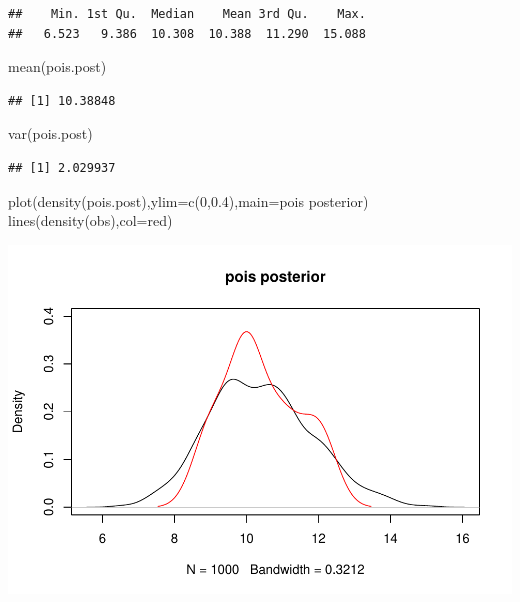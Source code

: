 \documentclass[
]{book}
\newenvironment{Shaded}{\begin{snugshade}}{\end{snugshade}}
\newcommand{\AttributeTok}[1]{\textcolor[rgb]{0.77,0.63,0.00}{#1}}
\newcommand{\DecValTok}[1]{\textcolor[rgb]{0.00,0.00,0.81}{#1}}
\newcommand{\FloatTok}[1]{\textcolor[rgb]{0.00,0.00,0.81}{#1}}
\newcommand{\FunctionTok}[1]{\textcolor[rgb]{0.00,0.00,0.00}{#1}}
\newcommand{\NormalTok}[1]{#1}
\newcommand{\StringTok}[1]{\textcolor[rgb]{0.31,0.60,0.02}{#1}}
\theoremstyle{definition}
\theoremstyle{definition}
\theoremstyle{definition}
\theoremstyle{definition}
\theoremstyle{remark}
\begin{document}
\begin{verbatim}
##    Min. 1st Qu.  Median    Mean 3rd Qu.    Max. 
##   6.523   9.386  10.308  10.388  11.290  15.088
\end{verbatim}

\begin{Shaded}
\begin{Highlighting}[]
  \FunctionTok{mean}\NormalTok{(pois.post)}
\end{Highlighting}
\end{Shaded}

\begin{verbatim}
## [1] 10.38848
\end{verbatim}

\begin{Shaded}
\begin{Highlighting}[]
  \FunctionTok{var}\NormalTok{(pois.post)}
\end{Highlighting}
\end{Shaded}

\begin{verbatim}
## [1] 2.029937
\end{verbatim}

\begin{Shaded}
\begin{Highlighting}[]
  \FunctionTok{plot}\NormalTok{(}\FunctionTok{density}\NormalTok{(pois.post),}\AttributeTok{ylim=}\FunctionTok{c}\NormalTok{(}\DecValTok{0}\NormalTok{,}\FloatTok{0.4}\NormalTok{),}\AttributeTok{main=}\StringTok{\textquotesingle{}pois posterior\textquotesingle{}}\NormalTok{)}
  \FunctionTok{lines}\NormalTok{(}\FunctionTok{density}\NormalTok{(obs),}\AttributeTok{col=}\StringTok{\textquotesingle{}red\textquotesingle{}}\NormalTok{)}
\end{Highlighting}
\end{Shaded}

\includegraphics{_main_files/figure-latex/unnamed-chunk-36-2.pdf}
\end{document}
